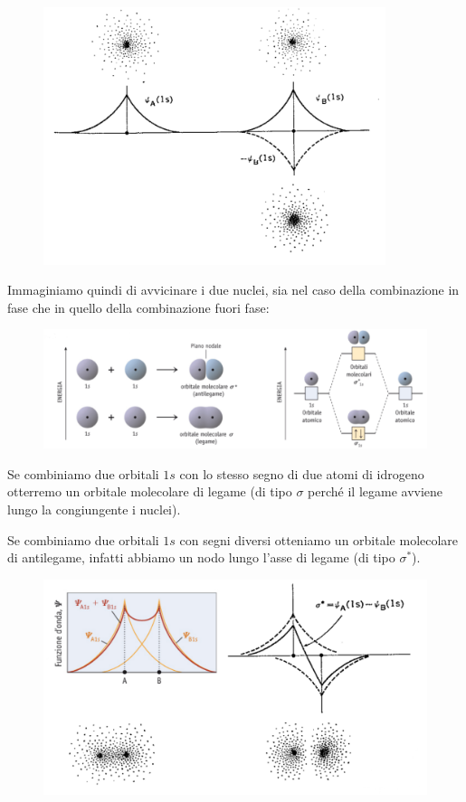 \begin{figure}[htp]
    \centering
    \includegraphics[width=10cm]{immagini/orbitali_atomici.png}
\end{figure}

Immaginiamo quindi di avvicinare i due nuclei, sia nel caso della combinazione in fase che in quello della combinazione fuori fase:

\begin{figure}[htp]
    \centering
    \includegraphics[width=12cm]{immagini/orbitali_molecolari_H_2.png}
\end{figure}

Se combiniamo due orbitali $1s$ con lo stesso segno di due atomi di idrogeno otterremo un orbitale molecolare di legame (di tipo $\sigma$ perché il legame avviene lungo la congiungente i nuclei).

Se combiniamo due orbitali $1s$ con segni diversi otteniamo un orbitale molecolare di antilegame, infatti abbiamo un nodo lungo l'asse di legame (di tipo $\sigma^*$).

\begin{figure}[htp]
    \centering
    \includegraphics[width=12cm]{immagini/combinazione_funzioni.png}
\end{figure}


